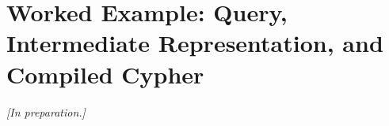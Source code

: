 %
\section{Worked Example: Query, Intermediate Representation, and Compiled Cypher}
\label{app:worked}

\textit{[In preparation.]}
